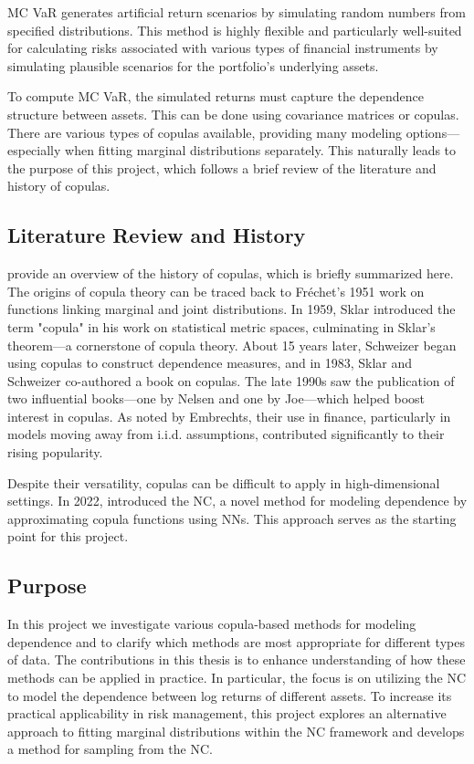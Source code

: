 \gls{MC} \gls{VaR} generates artificial return scenarios by simulating random numbers from specified distributions\footnotemark[\value{footnote}]. This method is highly flexible and particularly well-suited for calculating risks associated with various types of financial instruments by simulating plausible scenarios for the portfolio’s underlying assets.

To compute \gls{MC} \gls{VaR}, the simulated returns must capture the dependence structure between assets. This can be done using covariance matrices or copulas. There are various types of copulas available, providing many modeling options—especially when fitting marginal distributions separately. This naturally leads to the purpose of this project, which follows a brief review of the literature and history of copulas.

\subsection{Literature Review and History}\label{LiteratureReview}
 provide an overview of the history of copulas, which is briefly summarized here. The origins of copula theory can be traced back to Fréchet’s 1951 work on functions linking marginal and joint distributions. In 1959, Sklar introduced the term "copula" in his work on statistical metric spaces, culminating in Sklar’s theorem—a cornerstone of copula theory. About 15 years later, Schweizer began using copulas to construct dependence measures, and in 1983, Sklar and Schweizer co-authored a book on copulas. The late 1990s saw the publication of two influential books—one by Nelsen and one by Joe—which helped boost interest in copulas. As noted by Embrechts, their use in finance, particularly in models moving away from i.i.d. assumptions, contributed significantly to their rising popularity.

Despite their versatility, copulas can be difficult to apply in high-dimensional settings. In 2022,  introduced the \gls{NC}, a novel method for modeling dependence by approximating copula functions using \gls{NN}s. This approach serves as the starting point for this project.

\subsection{Purpose}\label{Purpose}
In this project we investigate various copula-based methods for modeling dependence and to clarify which methods are most appropriate for different types of data. The contributions in this thesis is to enhance understanding of how these methods can be applied in practice. In particular, the focus is on utilizing the \gls{NC} to model the dependence between log returns of different assets. To increase its practical applicability in risk management, this project explores an alternative approach to fitting marginal distributions within the \gls{NC} framework and develops a method for sampling from the \gls{NC}. 

